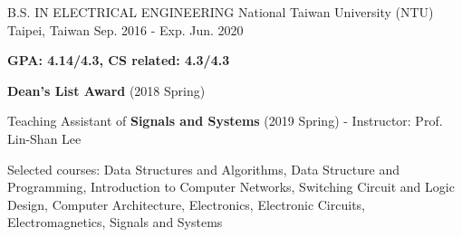 

\begin{cventries}

  \cventry
    {B.S. IN ELECTRICAL ENGINEERING } %
    {National Taiwan University (NTU) } %
    {Taipei, Taiwan} %
    {Sep. 2016 - Exp. Jun. 2020} %
    {
      \begin{cvitems} %
        \item {\textbf{GPA: 4.14/4.3, CS related: 4.3/4.3} }
        \item {\textbf{Dean's List Award} (2018 Spring)}
        \item {Teaching Assistant of \textbf{Signals and Systems} (2019 Spring) - Instructor: Prof. Lin-Shan Lee}
        \item {Selected courses:  Data Structures and Algorithms, Data Structure and Programming, Introduction to Computer Networks, Switching Circuit and Logic Design, Computer Architecture, Electronics, Electronic Circuits, Electromagnetics, Signals and Systems}
      \end{cvitems}
    }

\end{cventries}
